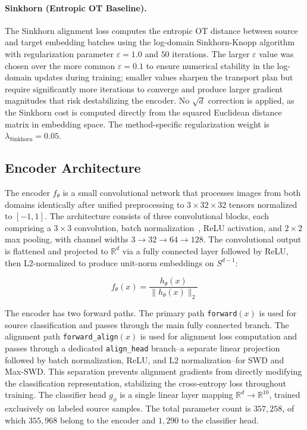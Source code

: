 \documentclass{article}
\begin{document}
	\paragraph{Sinkhorn (Entropic OT Baseline).}
	The Sinkhorn alignment loss computes the entropic OT distance between source and target embedding batches using the log-domain Sinkhorn-Knopp algorithm~\cite{marco} with regularization parameter $\varepsilon = 1.0$ and $50$ iterations. The larger $\varepsilon$ value was chosen over the more common $\varepsilon = 0.1$ to ensure numerical stability in the log-domain updates during training; smaller values sharpen the transport plan but require significantly more iterations to converge and produce larger gradient magnitudes that risk destabilizing the encoder. No $\sqrt{d}$ correction is applied, as the Sinkhorn cost is computed directly from the squared Euclidean distance matrix in embedding space. The method-specific regularization weight is $\lambda_{\mathrm{Sinkhorn}} = 0.05$.
	
	\subsection{Encoder Architecture}
	\label{sec:arch}
	
	The encoder $f_\theta$ is a small convolutional network that processes images from both domains identically after unified preprocessing to $3 \times 32 \times 32$ tensors normalized to $[-1, 1]$. The architecture consists of three convolutional blocks, each comprising a $3 \times 3$ convolution, batch normalization~\citep{sergey}, ReLU activation, and $2 \times 2$ max pooling, with channel widths $3 \to 32 \to 64 \to 128$. The convolutional output is flattened and projected to $\mathbb{R}^d$ via a fully connected layer followed by ReLU, then L2-normalized to produce unit-norm embeddings on $S^{d-1}$:
	
	\begin{equation}
		f_\theta(x) = \frac{h_\theta(x)}{\|h_\theta(x)\|_2}
		\label{eq:encoder}
	\end{equation}
	
	The encoder has two forward paths. The primary path \texttt{forward}$(x)$ is used for source classification and passes through the main fully connected branch. The alignment path \texttt{forward\_align}$(x)$ is used for alignment loss computation and passes through a dedicated \texttt{align\_head} branch--a separate linear projection followed by batch normalization, ReLU, and L2 normalization--for SWD and Max-SWD. This separation prevents alignment gradients from directly modifying the classification representation, stabilizing the cross-entropy loss throughout training. The classifier head $g_\phi$ is a single linear layer mapping $\mathbb{R}^d \to \mathbb{R}^{10}$, trained exclusively on labeled source samples. The total parameter count is $357{,}258$, of which $355{,}968$ belong to the encoder and $1{,}290$ to the classifier head.
	
\end{document}

